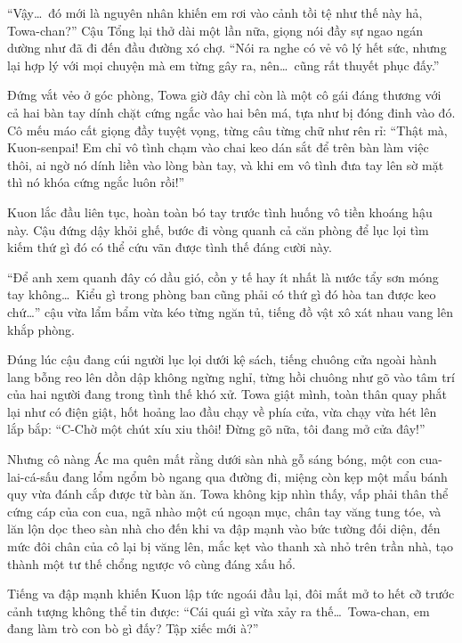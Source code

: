 \documentclass[../main.tex]{subfiles}
\begin{document}
``Vậy\dots\ đó mới là nguyên nhân khiến em rơi vào cảnh tồi tệ như thế này hả, Towa-chan?'' Cậu Tổng lại thở dài một lần nữa, giọng nói đầy sự ngao ngán dường như đã đi đến đầu đường xó chợ. ``Nói ra nghe có vẻ vô lý hết sức, nhưng lại hợp lý với mọi chuyện mà em từng gây ra, nên\dots\ cũng rất thuyết phục đấy.''

Đứng vắt vẻo ở góc phòng, Towa giờ đây chỉ còn là một cô gái đáng thương với cả hai bàn tay dính chặt cứng ngắc vào hai bên má, tựa như bị đóng đinh vào đó. Cô mếu máo cất giọng đầy tuyệt vọng, từng câu từng chữ như rên rỉ: ``Thật mà, Kuon-senpai! Em chỉ vô tình chạm vào chai keo dán sắt để trên bàn làm việc thôi, ai ngờ nó dính liền vào lòng bàn tay, và khi em vô tình đưa tay lên sờ mặt thì nó khóa cứng ngắc luôn rồi!''


Kuon lắc đầu liên tục, hoàn toàn bó tay trước tình huống vô tiền khoáng hậu này. Cậu đứng dậy khỏi ghế, bước đi vòng quanh cả căn phòng để lục lọi tìm kiếm thứ gì đó có thể cứu vãn được tình thế đáng cười này.

``Để anh xem quanh đây có dầu gió, cồn y tế hay ít nhất là nước tẩy sơn móng tay không\dots\ Kiểu gì trong phòng ban cũng phải có thứ gì đó hòa tan được keo chứ\dots'' cậu vừa lẩm bẩm vừa kéo từng ngăn tủ, tiếng đồ vật xô xát nhau vang lên khắp phòng.

Đúng lúc cậu đang cúi người lục lọi dưới kệ sách, tiếng chuông cửa ngoài hành lang bỗng reo lên dồn dập không ngừng nghỉ, từng hồi chuông như gõ vào tâm trí của hai người đang trong tình thế khó xử. Towa giật mình, toàn thân quay phắt lại như có điện giật, hốt hoảng lao đầu chạy về phía cửa, vừa chạy vừa hét lên lắp bắp: ``C-Chờ một chút xíu xiu thôi! Đừng gõ nữa, tôi đang mở cửa đây!''

Nhưng cô nàng Ác ma quên mất rằng dưới sàn nhà gỗ sáng bóng, một con cua-lai-cá-sấu đang lổm ngổm bò ngang qua đường đi, miệng còn kẹp một mẩu bánh quy vừa đánh cắp được từ bàn ăn. Towa không kịp nhìn thấy, vấp phải thân thể cứng cáp của con cua, ngã nhào một cú ngoạn mục, chân tay văng tung tóe, và lăn lộn dọc theo sàn nhà cho đến khi va đập mạnh vào bức tường đối diện, đến mức đôi chân của cô lại bị văng lên, mắc kẹt vào thanh xà nhỏ trên trần nhà, tạo thành một tư thế chổng ngược vô cùng đáng xấu hổ.


Tiếng va đập mạnh khiến Kuon lập tức ngoái đầu lại, đôi mắt mở to hết cỡ trước cảnh tượng không thể tin được: ``Cái quái gì vừa xảy ra thế\dots\ Towa-chan, em đang làm trò con bò gì đấy? Tập xiếc mới à?''
\end{document}
